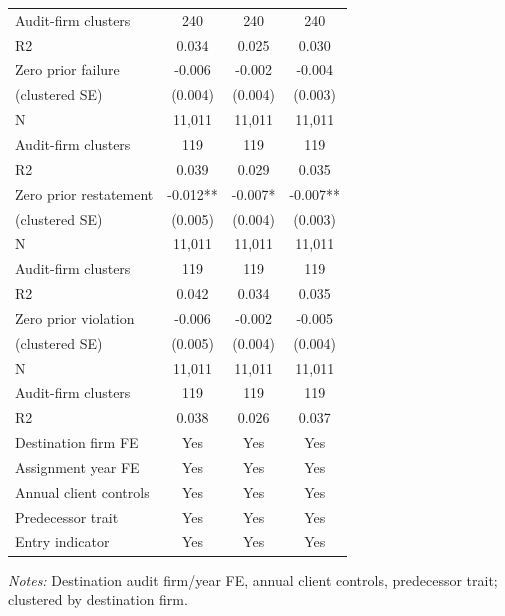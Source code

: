 \begin{table}[htbp]
\begin{threeparttable}
\begin{tabular}{p{}ccc}
Audit-firm clusters & 240 & 240 & 240 \\
R2 & 0.034 & 0.025 & 0.030 \\
Zero prior failure & -0.006 & -0.002 & -0.004 \\
(clustered SE) & (0.004) & (0.004) & (0.003) \\
N & 11,011 & 11,011 & 11,011 \\
Audit-firm clusters & 119 & 119 & 119 \\
R2 & 0.039 & 0.029 & 0.035 \\
Zero prior restatement & -0.012** & -0.007* & -0.007** \\
(clustered SE) & (0.005) & (0.004) & (0.003) \\
N & 11,011 & 11,011 & 11,011 \\
Audit-firm clusters & 119 & 119 & 119 \\
R2 & 0.042 & 0.034 & 0.035 \\
Zero prior violation & -0.006 & -0.002 & -0.005 \\
(clustered SE) & (0.005) & (0.004) & (0.004) \\
N & 11,011 & 11,011 & 11,011 \\
Audit-firm clusters & 119 & 119 & 119 \\
R2 & 0.038 & 0.026 & 0.037 \\
Destination firm FE & Yes & Yes & Yes \\
Assignment year FE & Yes & Yes & Yes \\
Annual client controls & Yes & Yes & Yes \\
Predecessor trait & Yes & Yes & Yes \\
Entry indicator & Yes & Yes & Yes \\
\bottomrule
\end{tabular}
\begin{tablenotes}\footnotesize
\item \raggedright \textit{Notes:} Destination audit firm/year FE, annual client controls, predecessor trait; clustered by destination firm.
\end{tablenotes}
\end{threeparttable}
\end{table}

